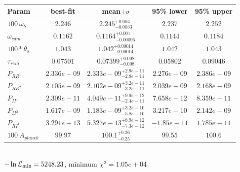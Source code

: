 \begin{tabular}{|l|c|c|c|c|} 
 \hline 
Param & best-fit & mean$\pm\sigma$ & 95\% lower & 95\% upper \\ \hline 
$100~\omega_{b }$ &$2.246$ & $2.245_{-0.0033}^{+0.004}$ & $2.237$ & $2.252$ \\ 
$\omega_{cdm }$ &$0.1162$ & $0.1164_{-0.00095}^{+0.001}$ & $0.1144$ & $0.1184$ \\ 
$100*\theta_{s }$ &$1.043$ & $1.042_{-0.00014}^{+0.00014}$ & $1.042$ & $1.043$ \\ 
$\tau_{reio }$ &$0.07501$ & $0.07399_{-0.008}^{+0.008}$ & $0.05802$ & $0.09046$ \\ 
$P_{{RR}^1 }$ &$2.336e-09$ & $2.333e-09_{-2.8e-11}^{+2.9e-11}$ & $2.276e-09$ & $2.386e-09$ \\ 
$P_{{RR}^2 }$ &$2.105e-09$ & $2.102e-09_{-3.2e-11}^{+3.2e-11}$ & $2.039e-09$ & $2.168e-09$ \\ 
$P_{{II}^1 }$ &$2.309e-11$ & $4.049e-11_{-2.4e-11}^{+9.9e-12}$ & $7.658e-12$ & $8.359e-11$ \\ 
$P_{{II}^2 }$ &$1.617e-09$ & $1.183e-09_{-5.8e-10}^{+3.2e-10}$ & $3.217e-10$ & $2.142e-09$ \\ 
$P_{{RI}^1 }$ &$3.291e-13$ & $5.327e-13_{-7.3e-12}^{+8.9e-12}$ & $-1.85e-11$ & $1.785e-11$ \\ 
$100~A_{planck }$ &$99.97$ & $100.1_{-0.25}^{+0.26}$ & $99.55$ & $100.6$ \\ 
\hline 
 \end{tabular} \\ 
$-\ln{\cal L}_\mathrm{min} =5248.23$, minimum $\chi^2=1.05e+04$ \\ 

